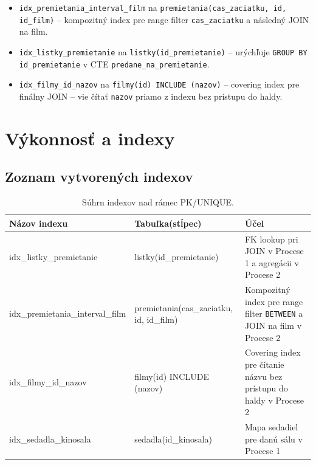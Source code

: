 \documentclass[11pt, a4paper]{article}
\begin{document}
\begin{itemize}
    \item \texttt{idx\_premietania\_interval\_film} na
    \texttt{premietania(cas\_zaciatku, id, id\_film)} -- kompozitný index pre
    range filter \texttt{cas\_zaciatku} a následný JOIN na film.
    \item \texttt{idx\_listky\_premietanie} na \texttt{listky(id\_premietanie)}
    -- urýchľuje \texttt{GROUP BY id\_premietanie} v CTE
    \texttt{predane\_na\_premietanie}.
    \item \texttt{idx\_filmy\_id\_nazov} na \texttt{filmy(id) INCLUDE (nazov)}
    -- covering index pre finálny JOIN -- vie čítať \texttt{nazov} priamo
    z indexu bez prístupu do haldy.
\end{itemize}

\newpage
\section{Výkonnosť a indexy}
\label{sec:vykonnost}

\subsection{Zoznam vytvorených indexov}

\begin{table}[H]
    \centering
    \begin{tabular}{l p{4.5cm} p{5cm}}
        \toprule
        \textbf{Názov indexu} & \textbf{Tabuľka(stĺpec)} & \textbf{Účel} \\
        \midrule
        idx\_listky\_premietanie         & listky(id\_premietanie)     & FK lookup pri JOIN v Procese 1 a agregácii v Procese 2 \\
        idx\_premietania\_interval\_film & premietania(cas\_zaciatku, id, id\_film) & Kompozitný index pre range filter \texttt{BETWEEN} a JOIN na film v Procese 2 \\
        idx\_filmy\_id\_nazov            & filmy(id) INCLUDE (nazov)   & Covering index pre čítanie názvu bez prístupu do haldy v Procese 2 \\
        idx\_sedadla\_kinosala           & sedadla(id\_kinosala)       & Mapa sedadiel pre danú sálu v Procese 1 \\
        \bottomrule
    \end{tabular}
    \caption{Súhrn indexov nad rámec PK/UNIQUE.}
\end{table}
\end{document}
